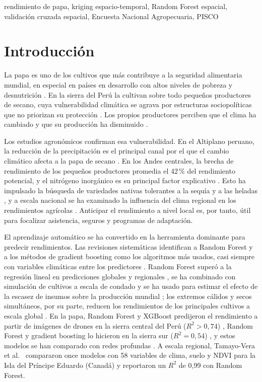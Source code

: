 \documentclass[conference,letterpaper]{IEEEtran}
\begin{document}
\begin{IEEEkeywords}
rendimiento de papa, kriging espacio-temporal, Random Forest espacial, validación cruzada espacial, Encuesta Nacional Agropecuaria, PISCO
\end{IEEEkeywords}

\section{Introducción}
La papa es uno de los cultivos que más contribuye a la seguridad alimentaria mundial, en especial en países en desarrollo con altos niveles de pobreza y desnutrición \cite{devaux2020}. En la sierra del Perú la cultivan sobre todo pequeños productores de secano, cuya vulnerabilidad climática se agrava por estructuras sociopolíticas que no priorizan su protección \cite{highlands2021}. Los propios productores perciben que el clima ha cambiado y que su producción ha disminuido \cite{perception2025}.

Los estudios agronómicos confirman esa vulnerabilidad. En el Altiplano peruano, la reducción de la precipitación es el principal canal por el que el cambio climático afecta a la papa de secano \cite{aquacrop2024}. En los Andes centrales, la brecha de rendimiento de los pequeños productores promedia el 42\,\% del rendimiento potencial, y el nitrógeno inorgánico es su principal factor explicativo \cite{yieldgap2020}. Esto ha impulsado la búsqueda de variedades nativas tolerantes a la sequía \cite{landraces2023} y a las heladas \cite{frost2024}, y a escala nacional se ha examinado la influencia del clima regional en los rendimientos agrícolas \cite{peruyield2026}. Anticipar el rendimiento a nivel local es, por tanto, útil para focalizar asistencia, seguros y programas de adaptación.

El aprendizaje automático se ha convertido en la herramienta dominante para predecir rendimientos. Las revisiones sistemáticas identifican a Random Forest y a los métodos de gradient boosting como los algoritmos más usados, casi siempre con variables climáticas entre los predictores \cite{vanklompenburg2020,shawon2025,obahoundje2025,plants2025}. Random Forest superó a la regresión lineal en predicciones globales y regionales \cite{jeong2016}, se ha combinado con simulación de cultivos a escala de condado \cite{sajid2022} y se ha usado para estimar el efecto de la escasez de insumos sobre la producción mundial \cite{inputs2023}; los extremos cálidos y secos simultáneos, por su parte, reducen los rendimientos de los principales cultivos a escala global \cite{extremes2023}. En la papa, Random Forest y XGBoost predijeron el rendimiento a partir de imágenes de drones en la sierra central del Perú ($R^2>0{,}74$) \cite{ccopi2024}, Random Forest y gradient boosting lo hicieron en la sierra sur ($R^2=0{,}54$) \cite{uav2026sur}, y estos modelos se han comparado con redes profundas \cite{potato2024ml}. A escala regional, Tamayo-Vera et al.\ \cite{tamayovera2025} compararon once modelos con 58 variables de clima, suelo y NDVI para la Isla del Príncipe Eduardo (Canadá) y reportaron un $R^2$ de 0,99 con Random Forest.
\end{document}
